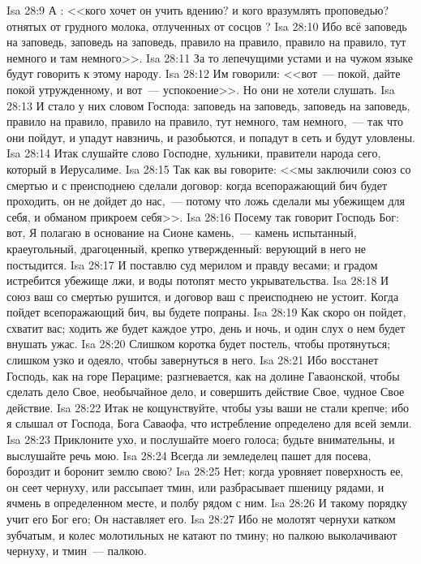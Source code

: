 \vs Isa 28:9 А : <<кого хочет он учить вдению? и кого вразумлять проповедью? отнятых от грудного молока, отлученных от сосцов ?
\vs Isa 28:10 Ибо всё заповедь на заповедь, заповедь на заповедь, правило на правило, правило на правило, тут немного и там немного>>.
\vs Isa 28:11 За то лепечущими устами и на чужом языке будут говорить к этому народу.
\vs Isa 28:12 Им говорили: <<вот~--- покой, дайте покой утружденному, и вот~--- успокоение>>. Но они не хотели слушать.
\vs Isa 28:13 И стало у них словом Господа: заповедь на заповедь, заповедь на заповедь, правило на правило, правило на правило, тут немного, там немного,~--- так что они пойдут, и упадут навзничь, и разобьются, и попадут в сеть и будут уловлены.
\rsbpar\vs Isa 28:14 Итак слушайте слово Господне, хульники, правители народа сего, который в Иерусалиме.
\vs Isa 28:15 Так как вы говорите: <<мы заключили союз со смертью и с преисподнею сделали договор: когда всепоражающий бич будет проходить, он не дойдет до нас,~--- потому что ложь сделали мы убежищем для себя, и обманом прикроем себя>>.
\rsbpar\vs Isa 28:16 Посему так говорит Господь Бог: вот, Я полагаю в основание на Сионе камень,~--- камень испытанный, краеугольный, драгоценный, крепко утвержденный: верующий в него не постыдится.
\vs Isa 28:17 И поставлю суд мерилом и правду весами; и градом истребится убежище лжи, и воды потопят место укрывательства.
\vs Isa 28:18 И союз ваш со смертью рушится, и договор ваш с преисподнею не устоит. Когда пойдет всепоражающий бич, вы будете попраны.
\vs Isa 28:19 Как скоро он пойдет, схватит вас; ходить же будет каждое утро, день и ночь, и один слух о нем будет внушать ужас.
\vs Isa 28:20 Слишком коротка будет постель, чтобы протянуться; слишком узко и одеяло, чтобы завернуться в него.
\vs Isa 28:21 Ибо восстанет Господь, как на горе Перациме; разгневается, как на долине Гаваонской, чтобы сделать дело Свое, необычайное дело, и совершить действие Свое, чудное Свое действие.
\rsbpar\vs Isa 28:22 Итак не кощунствуйте, чтобы узы ваши не стали крепче; ибо я слышал от Господа, Бога Саваофа, что истребление определено для всей земли.
\vs Isa 28:23 Приклоните ухо, и послушайте моего голоса; будьте внимательны, и выслушайте речь мою.
\vs Isa 28:24 Всегда ли земледелец пашет для посева, бороздит и боронит землю свою?
\vs Isa 28:25 Нет; когда уровняет поверхность ее, он сеет чернуху, или рассыпает тмин, или разбрасывает пшеницу рядами, и ячмень в определенном месте, и полбу рядом с ним.
\vs Isa 28:26 И такому порядку учит его Бог его; Он наставляет его.
\vs Isa 28:27 Ибо не молотят чернухи катком зубчатым, и колес молотильных не катают по тмину; но палкою выколачивают чернуху, и тмин~--- палкою.
